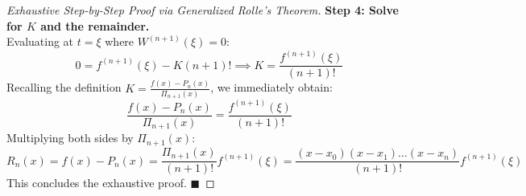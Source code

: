\begin{proof}[Exhaustive Step-by-Step Proof via Generalized Rolle's Theorem]
\noindent\textbf{Step 4: Solve for $K$ and the remainder.} \\
Evaluating at $t = \xi$ where $W^{(n+1)}(\xi) = 0$:
\begin{equation}
    0 = f^{(n+1)}(\xi) - K (n+1)! \implies K = \frac{f^{(n+1)}(\xi)}{(n+1)!}
\end{equation}
Recalling the definition $K = \frac{f(x) - P_n(x)}{\Pi_{n+1}(x)}$, we immediately obtain:
\begin{equation}
    \frac{f(x) - P_n(x)}{\Pi_{n+1}(x)} = \frac{f^{(n+1)}(\xi)}{(n+1)!}
\end{equation}
Multiplying both sides by $\Pi_{n+1}(x)$:
\begin{equation}
    \boxed{R_n(x) = f(x) - P_n(x) = \frac{\Pi_{n+1}(x)}{(n+1)!} f^{(n+1)}(\xi) = \frac{(x - x_0)(x - x_1)\dots(x - x_n)}{(n+1)!} f^{(n+1)}(\xi)}
\end{equation}
This concludes the exhaustive proof. $\blacksquare$
\end{proof}


